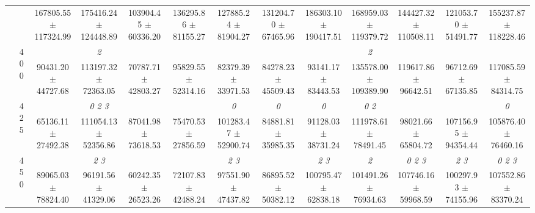 \begin{table}[h]
{\begin{tabular}{
        ccccccccccccc}
 & & \cellcolor[HTML]{EFEFEF} 167805.55 $\pm$ 117324.99& \cellcolor[HTML]{EFEFEF} 175416.24 $\pm$ 124448.89& \cellcolor[HTML]{EFEFEF} 103904.45 $\pm$ 60336.20& \cellcolor[HTML]{EFEFEF} 136295.86 $\pm$ 81155.27& \cellcolor[HTML]{EFEFEF} 127885.24 $\pm$ 81904.27& \cellcolor[HTML]{EFEFEF} 131204.70 $\pm$ 67465.96& \cellcolor[HTML]{EFEFEF} 186303.10 $\pm$ 190417.51& \cellcolor[HTML]{EFEFEF} 168959.03 $\pm$ 119379.72& \cellcolor[HTML]{EFEFEF} 144427.32 $\pm$ 110508.11& \cellcolor[HTML]{EFEFEF} 121053.70 $\pm$ 51491.77& \cellcolor[HTML]{EFEFEF} 155237.87 $\pm$ 118228.46 \\ 
 & \multirow{2}{*}{400}& & \textit{ 2 }& & & & & & \textit{ 2 }& & &  \\ 
 & & 90431.20 $\pm$ 44727.68& 113197.32 $\pm$ 72363.05& 70787.71 $\pm$ 42803.27& 95829.55 $\pm$ 52314.16& 82379.39 $\pm$ 33971.53& 84278.23 $\pm$ 45509.43& 93141.17 $\pm$ 83443.53& 135578.00 $\pm$ 109389.90& 119617.86 $\pm$ 96642.51& 96712.69 $\pm$ 67135.85& 117085.59 $\pm$ 84314.75 \\ 
 & \multirow{2}{*}{425}& \cellcolor[HTML]{EFEFEF} & \cellcolor[HTML]{EFEFEF} \textit{ 0 2 3 }& \cellcolor[HTML]{EFEFEF} & \cellcolor[HTML]{EFEFEF} & \cellcolor[HTML]{EFEFEF} \textit{ 0 }& \cellcolor[HTML]{EFEFEF} \textit{ 0 }& \cellcolor[HTML]{EFEFEF} \textit{ 0 }& \cellcolor[HTML]{EFEFEF} \textit{ 0 2 }& \cellcolor[HTML]{EFEFEF} & \cellcolor[HTML]{EFEFEF} & \cellcolor[HTML]{EFEFEF} \textit{ 0 } \\ 
 & & \cellcolor[HTML]{EFEFEF} 65136.11 $\pm$ 27492.38& \cellcolor[HTML]{EFEFEF} 111054.13 $\pm$ 52356.86& \cellcolor[HTML]{EFEFEF} 87041.98 $\pm$ 73618.53& \cellcolor[HTML]{EFEFEF} 75470.53 $\pm$ 27856.59& \cellcolor[HTML]{EFEFEF} 101283.47 $\pm$ 52900.74& \cellcolor[HTML]{EFEFEF} 84881.81 $\pm$ 35985.35& \cellcolor[HTML]{EFEFEF} 91128.03 $\pm$ 38731.24& \cellcolor[HTML]{EFEFEF} 111978.61 $\pm$ 78491.45& \cellcolor[HTML]{EFEFEF} 98021.66 $\pm$ 65804.72& \cellcolor[HTML]{EFEFEF} 107156.95 $\pm$ 94354.44& \cellcolor[HTML]{EFEFEF} 105876.40 $\pm$ 76460.16 \\ 
 & \multirow{2}{*}{450}& & \textit{ 2 3 }& & & \textit{ 2 3 }& & \textit{ 2 3 }& \textit{ 2 }& \textit{ 0 2 3 }& \textit{ 2 3 }& \textit{ 0 2 3 } \\ 
 & & 89065.03 $\pm$ 78824.40& 96191.56 $\pm$ 41329.06& 60242.35 $\pm$ 26523.26& 72107.83 $\pm$ 42488.24& 97551.90 $\pm$ 47437.82& 86895.52 $\pm$ 50382.12& 100795.47 $\pm$ 62838.18& 101491.26 $\pm$ 76934.63& 107746.16 $\pm$ 59968.59& 100297.93 $\pm$ 74155.96& 107552.86 $\pm$ 83370.24 \\ 

\end{tabular}}
\end{table}
